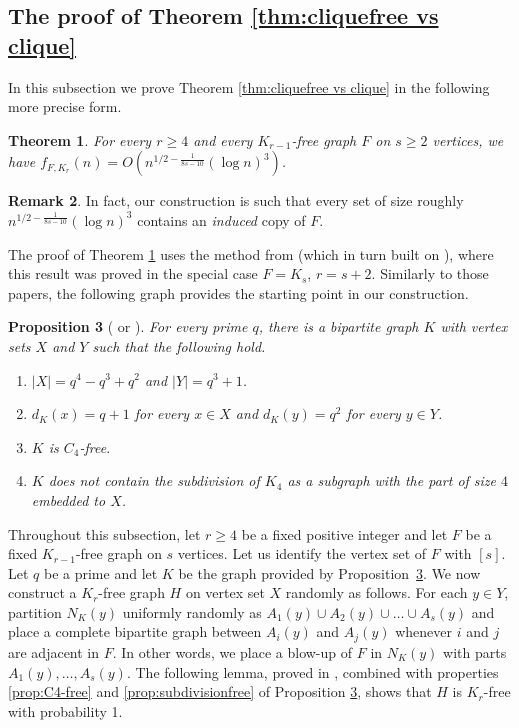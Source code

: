 \documentclass[11pt]{article}
\theoremstyle{plain}
\newtheorem{theorem}{Theorem}[section]
\newtheorem{proposition}[theorem]{Proposition}
\theoremstyle{definition}
\newtheorem{remark}[theorem]{Remark}
\begin{document}
\subsection{The proof of Theorem \ref{thm:cliquefree vs clique}}

In this subsection we prove Theorem \ref{thm:cliquefree vs clique} in the following more precise form.

\begin{theorem} \label{thm:cliquefree vs clique precise}
    For every $r\geq 4$ and every $K_{r-1}$-free graph $F$ on $s\geq 2$ vertices, we have $f_{F,K_r}(n)=O(n^{1/2-\frac{1}{8s-10}}(\log n)^3)$.
\end{theorem}

\begin{remark}
    In fact, our construction is such that every set of size roughly $n^{1/2-\frac{1}{8s-10}}(\log n)^3$ contains an \emph{induced} copy of $F$.
\end{remark}

The proof of Theorem \ref{thm:cliquefree vs clique precise} uses the method from \cite{Janzer_Sudakov} (which in turn built on \cite{Mattheus_Verstraete}), where this result was proved in the special case $F=K_s$, $r=s+2$. Similarly to those papers, the following graph provides the starting point in our construction.

\begin{proposition}[\cite{ONan72} or \cite{Mattheus_Verstraete}] \label{prop:algebraic graph}
    For every prime $q$, there is a bipartite graph $K$ with vertex sets $X$ and $Y$ such that the following hold.
    \begin{enumerate}
        \item $|X|=q^4-q^3+q^2$ and $|Y|=q^3+1$.
        \item $d_K(x)=q+1$ for every $x\in X$ and $d_K(y)=q^2$ for every $y\in Y$.
        \item $K$ is $C_4$-free. \label{prop:C4-free}
        \item $K$ does not contain the subdivision of $K_4$ as a subgraph with the part of size $4$ embedded to $X$. \label{prop:subdivisionfree}
    \end{enumerate}
\end{proposition}

Throughout this subsection, let $r\geq 4$ be a fixed positive integer and let $F$ be a fixed $K_{r-1}$-free graph on $s$ vertices. Let us identify the vertex set of $F$ with $[s]$. Let $q$ be a prime and let $K$ be the graph provided by Proposition~\ref{prop:algebraic graph}. We now construct a $K_r$-free graph $H$ on vertex set $X$ randomly as follows. 
For each $y\in Y$, partition $N_K(y)$ uniformly randomly as $A_1(y)\cup A_2(y)\cup \dots \cup A_s(y)$ and place a complete bipartite graph between $A_i(y)$ and $A_j(y)$ whenever $i$ and $j$ are adjacent in $F$. In other words, we place a blow-up of $F$ in $N_K(y)$ with parts $A_1(y),\dots,A_s(y)$. The following lemma, proved in \cite{Janzer_Sudakov}, combined with properties \ref{prop:C4-free} and \ref{prop:subdivisionfree} of Proposition \ref{prop:algebraic graph}, shows that $H$ is $K_r$-free with probability 1.
\end{document}
